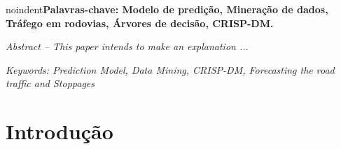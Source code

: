 \documentclass[conference,compsoc]{IEEEtran}
\begin{document}
\vspace{0.1cm}

noindent\textbf{Palavras-chave: Modelo de predição, Mineração de dados, Tráfego em rodovias, Árvores de decisão, CRISP-DM.}


\vspace{0.1cm}

\textit{Abstract -- This paper intends to make an explanation ...}

\textit{Keywords: Prediction Model, Data Mining, CRISP-DM, Forecasting the road traffic and Stoppages}




%
\IEEEpeerreviewmaketitle



\section{Introdução}
\end{document}
